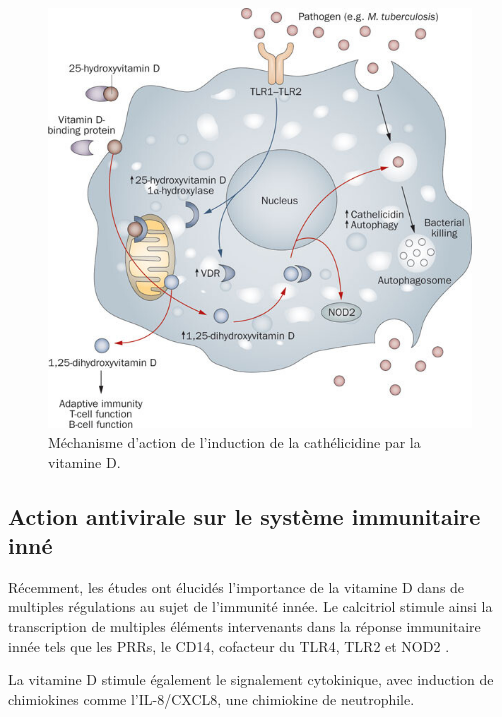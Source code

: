 \documentclass[
  a4paper,
  DIV=11,
  numbers=noendperiod,
  listof=totoc]{scrreprt}
\begin{document}
\begin{figure}

{\centering \includegraphics{figures/vd-mecha-cathelicidin.jpg}

}

\caption{Méchanisme d'action de l'induction de la cathélicidine par la
vitamine D.}

\end{figure}

\hypertarget{action-antivirale-sur-le-systuxe8me-immunitaire-innuxe9}{%
\subsection{Action antivirale sur le système immunitaire
inné}\label{action-antivirale-sur-le-systuxe8me-immunitaire-innuxe9}}

Récemment, les études ont élucidés l'importance de la vitamine D dans de
multiples régulations au sujet de l'immunité innée. Le calcitriol
stimule ainsi la transcription de multiples éléments intervenants dans
la réponse immunitaire innée tels que les PRRs, le CD14, cofacteur du
TLR4, TLR2 et NOD2 \autocite{White.2022}.

La vitamine D stimule également le signalement cytokinique, avec
induction de chimiokines comme l'IL-8/CXCL8, une chimiokine de
neutrophile.
\end{document}
